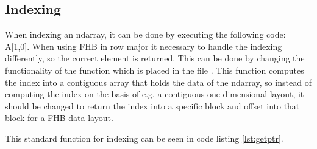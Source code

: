 %  







\subsection{Indexing}

When indexing an ndarray, it can be done by executing the following
code: A[1,0]. When using FHB in row major it necessary to handle the
indexing differently, so the correct element is returned. This can be
done by changing the functionality of the
function  which is placed in the
file . This function computes the index into
a contiguous array that holds the data of the ndarray, so instead of
computing the index on the basis of e.g. a contiguous one dimensional
layout, it should be changed to return the index into a specific block
and offset into that block for a FHB data layout.

This standard function for indexing can be seen in code listing \ref{lst:getptr}.


